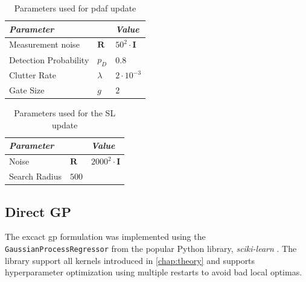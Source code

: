 \begin{table}[h]
    \centering
    \begin{tabular}{lll}
        \textit{\textbf{Parameter}} &                  & \textit{\textbf{Value}}     \\ \hline
        Measurement noise           & $\boldsymbol{R}$ & $50^2 \cdot \boldsymbol{I}$ \\
        Detection Probability       & $p_D$            & $0.8$                       \\
        Clutter Rate                & $\lambda$        & $2 \cdot 10^{-3}$           \\
        Gate Size                   & $g$              & $2$
    \end{tabular}
    \caption{Parameters used for \acrshort{pdaf} update}
    \label{table:stats_pdaf_params}
\end{table}

\begin{table}[h]
    \centering
    \begin{tabular}{lll}
        \textit{\textbf{Parameter}} &                  & \textit{\textbf{Value}}       \\ \hline
        Noise                       & $\boldsymbol{R}$ & $2000^2 \cdot \boldsymbol{I}$ \\
        Search Radius               & $500$
    \end{tabular}
    \caption{Parameters used for the SL update}
    \label{table:stats_sl_params}
\end{table}

\subsection{Direct GP}
The excact \acrshort{gp} formulation was implemented using the \texttt{GaussianProcessRegressor} from the popular Python library, \textit{sciki-learn} \cite{scikit-learn}. The library support all kernels introduced in \cref{chap:theory} and supports hyperparameter optimization using multiple restarts to avoid bad local optimas.



